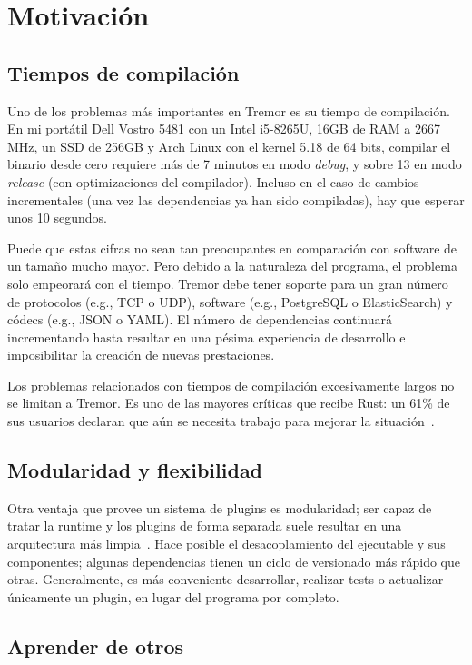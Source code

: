 \section{Motivación}

\subsection{Tiempos de compilación}

Uno de los problemas más importantes en Tremor es su tiempo de compilación. En
mi portátil Dell Vostro 5481 con un Intel i5-8265U, 16GB de RAM a 2667 MHz, un
SSD de 256GB y Arch Linux con el kernel 5.18 de 64 bits, compilar el binario
 desde cero requiere más de 7 minutos en modo \emph{debug}, y sobre
13 en modo \emph{release} (con optimizaciones del compilador). Incluso en el
caso de cambios incrementales (una vez las dependencias ya han sido compiladas),
hay que esperar unos 10 segundos.

Puede que estas cifras no sean tan preocupantes en comparación con software de
un tamaño mucho mayor. Pero debido a la naturaleza del programa, el problema
solo empeorará con el tiempo. Tremor debe tener soporte para un gran número de
protocolos (e.g., TCP o UDP), software (e.g., PostgreSQL o ElasticSearch) y
códecs (e.g., JSON o YAML). El número de dependencias continuará incrementando
hasta resultar en una pésima experiencia de desarrollo e imposibilitar la
creación de nuevas prestaciones.

Los problemas relacionados con tiempos de compilación excesivamente largos no se
limitan a Tremor. Es uno de las mayores críticas que recibe Rust: un 61\% de sus
usuarios declaran que aún se necesita trabajo para mejorar la
situación~\cite{rustsurvey}.

\subsection{Modularidad y flexibilidad}

Otra ventaja que provee un sistema de plugins es modularidad; ser capaz de
tratar la runtime y los plugins de forma separada suele resultar en una
arquitectura más limpia~\cite{baldwin2000design}. Hace posible el
desacoplamiento del ejecutable y sus componentes; algunas dependencias tienen un
ciclo de versionado más rápido que otras. Generalmente, es más conveniente
desarrollar, realizar tests o actualizar únicamente un plugin, en lugar del
programa por completo.

\subsection{Aprender de otros}

